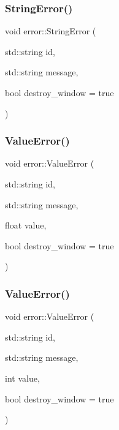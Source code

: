 \hypertarget{namespaceerror_a66d4ae4163a05f4ee9b28831c6c8118a}{}\label{namespaceerror_a66d4ae4163a05f4ee9b28831c6c8118a} 
\subsubsection{\texorpdfstring{String\+Error()}{StringError()}}
{\footnotesize\ttfamily void error\+::\+String\+Error (\begin{DoxyParamCaption}\item[{std\+::string}]{id,  }\item[{std\+::string}]{message,  }\item[{bool}]{destroy\+\_\+window = {\ttfamily true} }\end{DoxyParamCaption})}

\hypertarget{namespaceerror_a019f42947a3ea3414560875df66d5eb5}{}\label{namespaceerror_a019f42947a3ea3414560875df66d5eb5} 
\subsubsection{\texorpdfstring{Value\+Error()}{ValueError()}\hspace{0.1cm}{\footnotesize\ttfamily [1/2]}}
{\footnotesize\ttfamily void error\+::\+Value\+Error (\begin{DoxyParamCaption}\item[{std\+::string}]{id,  }\item[{std\+::string}]{message,  }\item[{float}]{value,  }\item[{bool}]{destroy\+\_\+window = {\ttfamily true} }\end{DoxyParamCaption})}

\hypertarget{namespaceerror_a7d5d0c6be08af9155409c2f1c900dbb1}{}\label{namespaceerror_a7d5d0c6be08af9155409c2f1c900dbb1} 
\subsubsection{\texorpdfstring{Value\+Error()}{ValueError()}\hspace{0.1cm}{\footnotesize\ttfamily [2/2]}}
{\footnotesize\ttfamily void error\+::\+Value\+Error (\begin{DoxyParamCaption}\item[{std\+::string}]{id,  }\item[{std\+::string}]{message,  }\item[{int}]{value,  }\item[{bool}]{destroy\+\_\+window = {\ttfamily true} }\end{DoxyParamCaption})}

